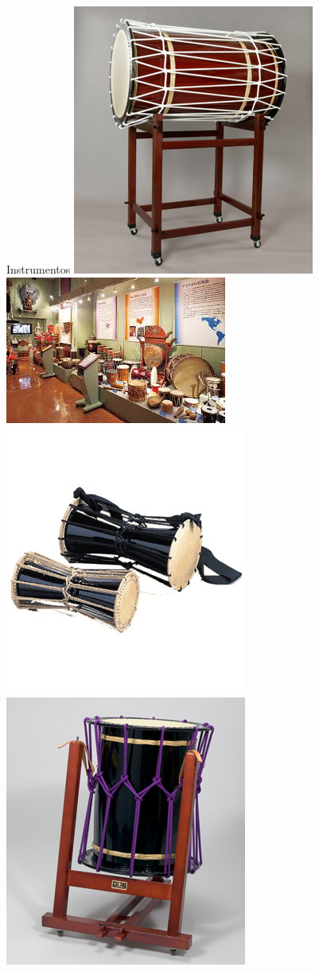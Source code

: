 \documentclass{beamer}
\begin{document}
\begin{frame}{Instrumentos}
    \includegraphics[height=0.2\textheight]{instrumentos-4}
    \includegraphics[height=0.2\textheight]{instrumentos-5}
    \includegraphics[height=0.2\textheight]{instrumentos-6}
    \includegraphics[height=0.2\textheight]{instrumentos-7}

\end{frame}
\end{document}
